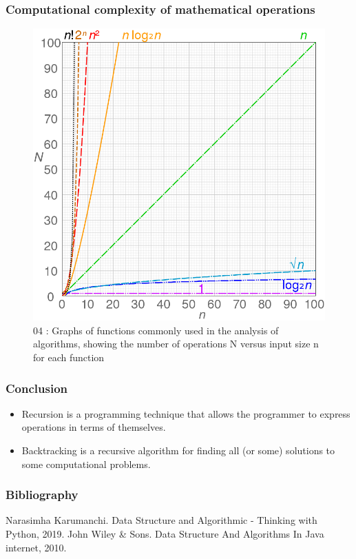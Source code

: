 \documentclass{beamer}
\begin{document}
\begin{frame}
\frametitle{Computational complexity of mathematical operations}
\begin{figure}
\includegraphics[scale=0.20]{img/ch01_comparison_computational_complexity.png}
\caption{04 : Graphs of functions commonly used in the analysis of algorithms, showing the number of operations N versus input size n for each function}
\end{figure}
\end{frame}


\begin{frame}
\frametitle{Conclusion}
\begin{itemize}
\item Recursion is a programming technique that allows the programmer to express
operations in terms of themselves.
\item Backtracking is a recursive algorithm for finding all (or some) solutions to some computational problems.
\end{itemize}
\end{frame}

\begin{frame}
\frametitle{Bibliography}

\begin{thebibliography}{0000}
  \bibitem{} Narasimha Karumanchi. Data Structure and Algorithmic - Thinking with Python, 2019.
  \bibitem{} John Wiley \& Sons. Data Structure And Algorithms In Java  internet, 2010.
\end{thebibliography}
\end{frame}
\end{document}
